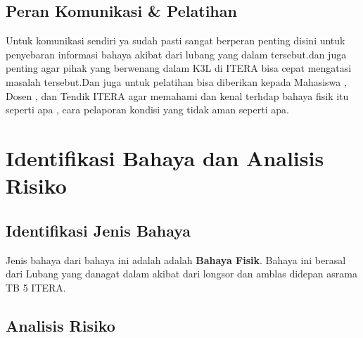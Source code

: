 \documentclass[a4paper, 12pt]{article}
\begin{document}
\subsection{Peran Komunikasi \& Pelatihan}
Untuk komunikasi sendiri ya sudah pasti sangat berperan penting disini untuk penyebaran informasi bahaya akibat dari lubang yang dalam tersebut.dan juga penting agar pihak yang berwenang dalam K3L di ITERA bisa cepat mengatasi masalah tersebut.Dan juga untuk pelatihan bisa diberikan kepada Mahasiswa , Dosen , dan Tendik ITERA agar memahami dan kenal terhdap bahaya fisik itu seperti apa , cara pelaporan kondisi yang tidak aman seperti apa.
\section{Identifikasi Bahaya dan Analisis Risiko}

\subsection{Identifikasi Jenis Bahaya}
Jenis bahaya dari bahaya ini adalah adalah \textbf{Bahaya Fisik}. Bahaya ini berasal dari Lubang yang danagat dalam akibat dari longsor dan amblas didepan asrama TB 5 ITERA.
\subsection{Analisis Risiko}
\end{document}
